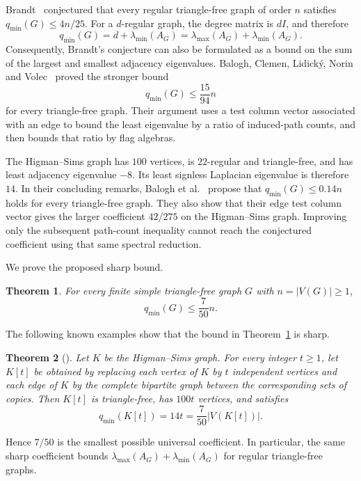 \documentclass[11pt]{article}
\newcommand{\qmin}{q_{\min}}
\newtheorem{theorem}{Theorem}
\begin{document}
Brandt~\cite{Brandt} conjectured that every regular triangle-free graph
of order $n$ satisfies $\qmin(G)\leq4n/25$. For a $d$-regular graph,
the degree matrix is $dI$, and therefore
\[
\qmin(G)=d+\lambda_{\min}(A_G)
=\lambda_{\max}(A_G)+\lambda_{\min}(A_G).
\]
Consequently, Brandt's conjecture can also be formulated as a bound on
the sum of the largest and smallest adjacency eigenvalues. Balogh,
Clemen, Lidick\'y, Norin and Volec~\cite{BCLNV} proved the stronger bound
\[
\qmin(G)\leq\frac{15}{94}n
\]
for every triangle-free graph. Their argument uses a test column vector
associated with an edge to bound the least eigenvalue by a ratio of
induced-path counts, and then bounds that ratio by flag algebras.

The Higman--Sims graph has $100$ vertices, is $22$-regular and
triangle-free, and has least adjacency eigenvalue $-8$. Its least
signless Laplacian eigenvalue is therefore $14$. In their concluding
remarks, Balogh et al.~\cite{BCLNV} propose that
$\qmin(G)\leq0.14n$ holds for every triangle-free graph. They also show
that their edge test column vector gives the larger coefficient $42/275$ on
the Higman--Sims graph. Improving only the subsequent path-count
inequality cannot reach the conjectured coefficient using that same
spectral reduction.

We prove the proposed sharp bound.
\begin{theorem}\label{thm:bound}
For every finite simple triangle-free graph $G$ with $n=|V(G)|\geq1$,
\[
\qmin(G)\leq\frac7{50}n.
\]
\end{theorem}
The following known examples show that the bound in
Theorem~\ref{thm:bound} is sharp.
\begin{theorem}[{\cite{deLimaNikiforovOliveira}}]\label{thm:sharpness}
Let $K$ be the Higman--Sims graph. For every integer $t\geq1$, let $K[t]$
be obtained by replacing each vertex of $K$ by $t$ independent vertices
and each edge of $K$ by the complete bipartite graph between the corresponding
sets of copies. Then $K[t]$ is triangle-free, has $100t$ vertices, and satisfies
\[
\qmin(K[t])=14t=\frac7{50}|V(K[t])|.
\]
\end{theorem}
Hence $7/50$ is the smallest possible universal coefficient.
In particular, the same sharp coefficient bounds
$\lambda_{\max}(A_G)+\lambda_{\min}(A_G)$ for regular triangle-free graphs.
\end{document}

